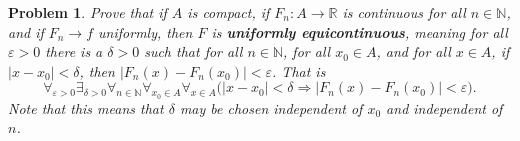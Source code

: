 \documentclass{article}
\theoremstyle{normal}
\newtheorem{problem}{Problem}
\newif\ifsolution
\begin{document}
        \color{black}
    \fi
    \begin{problem}
        Prove that if $A$ is compact, if $F_{n}:A\rightarrow\mathbb{R}$ is
        continuous for all $n\in\mathbb{N}$, and if
        $F_{n}\rightarrow{f}$ uniformly, then $F$ is
        \textbf{uniformly equicontinuous}, meaning for all $\varepsilon>0$
        there is a $\delta>0$ such that for all $n\in\mathbb{N}$, for all
        $x_{0}\in{A}$, and for all $x\in{A}$, if
        $|x-x_{0}|<\delta$, then
        $|F_{n}(x)-F_{n}(x_{0})|<\varepsilon$.
        That is
        \begin{equation}
            \forall_{\varepsilon>0}
            \exists_{\delta>0}
            \forall_{n\in\mathbb{N}}
            \forall_{x_{0}\in{A}}
            \forall_{x\in{A}}
            \Big(
                |x-x_{0}|<\delta
                \Rightarrow
                |F_{n}(x)-F_{n}(x_{0})|<\varepsilon
            \Big).
        \end{equation}
        Note that this means that $\delta$ may be chosen independent of
        $x_{0}$ and independent of $n$.
    \end{problem}
    \ifsolution
        \color{blue}
\end{document}
